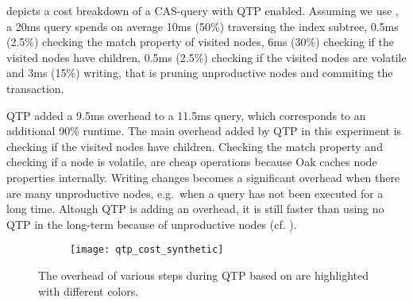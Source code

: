 \documentclass[abstracton,12pt]{scrartcl}
\theoremstyle{definition}
\begin{document}
 depicts a cost breakdown of a CAS-query with QTP enabled.
Assuming we use , a 20ms query spends on 
average 10ms (50\%) traversing the index subtree, 0.5ms (2.5\%) checking
the match property of visited nodes, 6ms (30\%) checking if the visited nodes
have children, 0.5ms (2.5\%) checking if the visited nodes are volatile and 3ms
(15\%) writing, that is pruning unproductive nodes and commiting the transaction.

QTP added a 9.5ms overhead to a 11.5ms query, which corresponds to an additional 90\%
runtime. The main overhead added by QTP in this experiment is checking if the visited 
nodes have children. Checking the match property and checking if a node is volatile, 
are cheap operations because Oak caches node properties internally.
Writing changes becomes a significant overhead when there are many
unproductive nodes, e.g.\ when a query has not been executed for a long time.
Altough QTP is adding an overhead, it is still faster than using no QTP
in the long-term because of unproductive nodes (cf. ).


\begin{figure}[H]
  \centering
  \begin{subfigure}{0.49\linewidth}
    \centering
    \texttt{[image: qtp\_cost\_synthetic]}
  \end{subfigure}
  \begin{subfigure}{0.49\linewidth}
    \centering
  \end{subfigure}
  \caption[QTP overhead]{The overhead of various steps during QTP based on 
       are highlighted with different colors.}
    \label{fig:qtp-overhead}
\end{figure}
\end{document}
